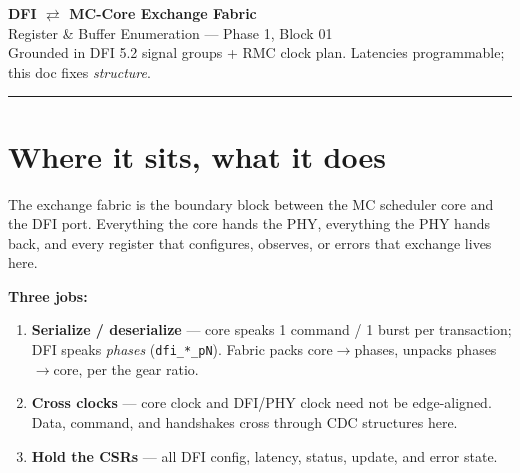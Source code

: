 \documentclass[11pt]{article}
\newcommand{\sig}[1]{\texttt{#1}}
\begin{document}
\begin{center}
{\LARGE\bfseries DFI $\rightleftarrows$ MC-Core Exchange Fabric}\\[2pt]
{\large Register \& Buffer Enumeration --- Phase 1, Block 01}\\[6pt]
{\footnotesize Grounded in DFI 5.2 signal groups + RMC clock plan. Latencies programmable;
this doc fixes \emph{structure}.}
\end{center}
\vspace{4pt}\hrule\vspace{10pt}

\section{Where it sits, what it does}

The exchange fabric is the boundary block between the MC scheduler core and the DFI port.
Everything the core hands the PHY, everything the PHY hands back, and every register that
configures, observes, or errors that exchange lives here.

\begin{center}
\end{center}

\textbf{Three jobs:}
\begin{enumerate}[nosep,leftmargin=1.4em]
  \item \textbf{Serialize / deserialize} --- core speaks 1 command / 1 burst per
    transaction; DFI speaks \emph{phases} (\sig{dfi\_*\_pN}). Fabric packs core$\to$phases,
    unpacks phases$\to$core, per the gear ratio.
  \item \textbf{Cross clocks} --- core clock and DFI/PHY clock need not be edge-aligned.
    Data, command, and handshakes cross through CDC structures here.
  \item \textbf{Hold the CSRs} --- all DFI config, latency, status, update, and error state.
\end{enumerate}
\end{document}
